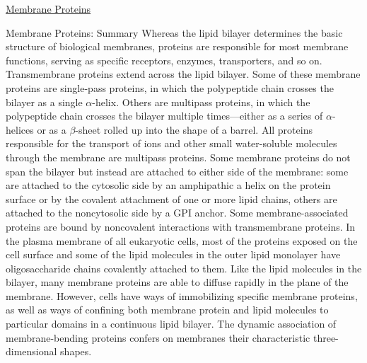 \documentclass[12pt,letterpaper]{article}
\newcommand{\thetitle}{\hypertarget{home}{Cellular Biology}}
\begin{document}
\begin{secbox}{\hyperlink{10}{Membrane Proteins}}
{    \begin{probbox}{Membrane Proteins: Summary}
        Whereas the lipid bilayer determines the basic structure of biological membranes, proteins are responsible for most membrane functions, serving as specific receptors, enzymes, transporters, and so on. Transmembrane proteins extend across the lipid bilayer. Some of these membrane proteins are single-pass proteins, in which the polypeptide chain crosses the bilayer as a single \(\alpha\)-helix. Others are multipass proteins, in which the polypeptide chain crosses the bilayer multiple times---either as a series of \(\alpha\)-helices or as a \(\beta\)-sheet rolled up into the shape of a barrel. All proteins responsible for the transport of ions and other small water-soluble molecules through the membrane are multipass proteins. Some membrane proteins do not span the bilayer but instead are attached to either side of the membrane: some are attached to the cytosolic side by an amphipathic a helix on the protein surface or by the covalent attachment of one or more lipid chains, others are attached to the noncytosolic side by a GPI anchor. Some membrane-associated proteins are bound by noncovalent interactions with transmembrane proteins. In the plasma membrane of all eukaryotic cells, most of the proteins exposed on the cell surface and some of the lipid molecules in the outer lipid monolayer have oligosaccharide chains covalently attached to them. Like the lipid molecules in the bilayer, many membrane proteins are able to diffuse rapidly in the plane of the membrane. However, cells have ways of immobilizing specific membrane proteins, as well as ways of confining both membrane protein and lipid molecules to particular domains in a continuous lipid bilayer. The dynamic association of membrane-bending proteins confers on membranes their characteristic three-dimensional shapes.
    \end{probbox}
}\end{secbox}


\clearpage
\renewcommand{\thetitle}{\hypertarget{11}{Transport Across Membranes}}
\hypertarget{11}{}
\end{document}
